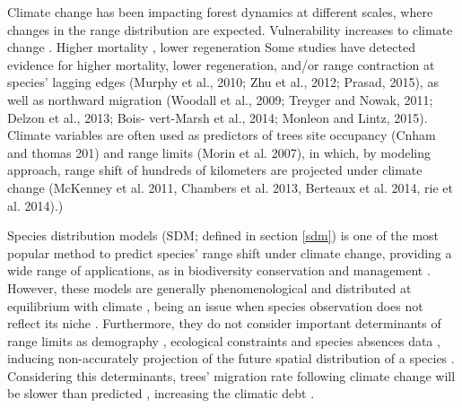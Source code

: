 Climate change has been impacting forest dynamics at different scales, where changes in the range distribution are expected.
Vulnerability increases to climate change \parencite{Rogers2016}.
Higher mortality \parencite{}, lower regeneration
Some studies have detected evidence for higher mortality, lower regeneration, and/or range contraction at species’ lagging edges (Murphy et al., 2010; Zhu et al., 2012; Prasad, 2015), as well as northward migration (Woodall et al., 2009; Treyger and Nowak, 2011; Delzon et al., 2013; Bois- vert-Marsh et al., 2014; Monleon and Lintz, 2015).
Climate variables are often used as predictors of trees site occupancy (Cnham and thomas 201) and range limits (Morin et al. 2007), in which, by modeling approach, range shift of hundreds of kilometers are projected under climate change (McKenney et al. 2011, Chambers et al. 2013, Berteaux et al. 2014, rie et al. 2014).)

Species distribution models (SDM; defined in section \ref{sdm}) is one of the most popular method to predict species' range shift under climate change, providing a wide range of applications, as in biodiversity conservation and management \parencite{Guisan2005,Guisan2013}.
However, these models are generally phenomenological and  distributed at equilibrium with climate \parencite[e.g.][]{Pigot2013}, being an issue when species observation does not reflect its niche \parencite{Schurr2012}.
Furthermore, they do not consider important determinants of range limits as demography \parencite{Louthan2015}, ecological constraints \parencite{Wisz2013,Pigot2013} and species absences data \parencite{Koshkina2017}, inducing non-accurately projection of the future spatial distribution of a species \parencite{Tavecchia2016}.
Considering this determinants, trees' migration rate following climate change will be slower than predicted \parencite{Bertrand2011,Sittaro2017}, increasing the climatic debt \parencite{Bertrand2016}.

